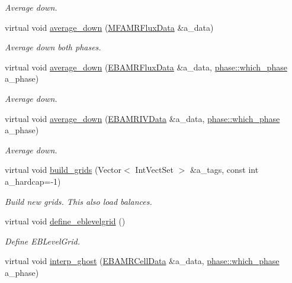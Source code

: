 \begin{DoxyCompactItemize}
\begin{DoxyCompactList}\small\item\em Average down. \end{DoxyCompactList}\item 
virtual void \hyperlink{classamr__mesh_a973a270133715524cacc9bd50951485a}{average\+\_\+down} (\hyperlink{type__definitions_8H_a4033d82364b7e6655b58257749d7881f}{M\+F\+A\+M\+R\+Flux\+Data} \&a\+\_\+data)
\begin{DoxyCompactList}\small\item\em Average down both phases. \end{DoxyCompactList}\item 
virtual void \hyperlink{classamr__mesh_a92cf2e00b7a3ae3299550e2e99253136}{average\+\_\+down} (\hyperlink{type__definitions_8H_aadad278b2e5d3d4abcf9032f90ba78c3}{E\+B\+A\+M\+R\+Flux\+Data} \&a\+\_\+data, \hyperlink{namespacephase_a23c76f548a5eb1955ed8c929c541108b}{phase\+::which\+\_\+phase} a\+\_\+phase)
\begin{DoxyCompactList}\small\item\em Average down. \end{DoxyCompactList}\item 
virtual void \hyperlink{classamr__mesh_ac4689dedf493e9ca66168bf96f077742}{average\+\_\+down} (\hyperlink{type__definitions_8H_a6b8fa905d55cbb491b52180386f0e0c1}{E\+B\+A\+M\+R\+I\+V\+Data} \&a\+\_\+data, \hyperlink{namespacephase_a23c76f548a5eb1955ed8c929c541108b}{phase\+::which\+\_\+phase} a\+\_\+phase)
\begin{DoxyCompactList}\small\item\em Average down. \end{DoxyCompactList}\item 
virtual void \hyperlink{classamr__mesh_a39855e0c40fdc44e1042918f1025c8b6}{build\+\_\+grids} (Vector$<$ Int\+Vect\+Set $>$ \&a\+\_\+tags, const int a\+\_\+hardcap=-\/1)
\begin{DoxyCompactList}\small\item\em Build new grids. This also load balances. \end{DoxyCompactList}\item 
virtual void \hyperlink{classamr__mesh_a24fb5fb993ea6ef6dd4a9d77fd587009}{define\+\_\+eblevelgrid} ()
\begin{DoxyCompactList}\small\item\em Define E\+B\+Level\+Grid. \end{DoxyCompactList}\item 
virtual void \hyperlink{classamr__mesh_ac014790f636d89a0ecd368b4a5807b1c}{interp\+\_\+ghost} (\hyperlink{type__definitions_8H_a7e610f301989e5e07781c5e338bdb7c3}{E\+B\+A\+M\+R\+Cell\+Data} \&a\+\_\+data, \hyperlink{namespacephase_a23c76f548a5eb1955ed8c929c541108b}{phase\+::which\+\_\+phase} a\+\_\+phase)

\end{DoxyCompactItemize}
